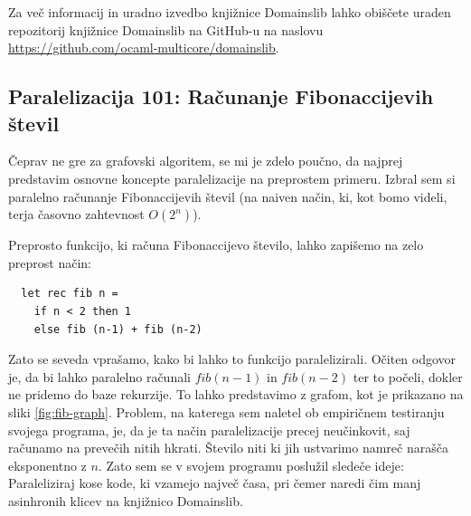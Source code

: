 \documentclass[mat1, tisk]{fmfdelo}
\begin{document}
Za več informacij in uradno izvedbo knjižnice Domainslib lahko obiščete uraden repozitorij knjižnice Domainslib na
GitHub-u na naslovu \url{https://github.com/ocaml-multicore/domainslib}.


\subsection{Paralelizacija 101: Računanje Fibonaccijevih števil}

Čeprav ne gre za grafovski algoritem, se mi je zdelo poučno, da najprej predstavim osnovne koncepte paralelizacije na preprostem primeru. 
Izbral sem si paralelno računanje Fibonaccijevih števil (na naiven način, ki, kot bomo videli, terja časovno zahtevnost $O(2^n)$).

Preprosto funkcijo, ki računa Fibonaccijevo število, lahko zapišemo na zelo preprost način:

\begin{lstlisting}
  let rec fib n =
    if n < 2 then 1
    else fib (n-1) + fib (n-2)
\end{lstlisting}

\begin{figure}[htb]
  \centering
{}
\end{figure}


Zato se seveda vprašamo, kako bi lahko to funkcijo paralelizirali. Očiten odgovor je, da bi lahko paralelno računali $fib(n-1)$ in $fib(n-2)$ ter to počeli,
dokler ne pridemo do baze rekurzije. To lahko predstavimo z grafom, kot je prikazano na sliki \ref{fig:fib-graph}.
Problem, na katerega sem naletel ob empiričnem testiranju svojega programa, je, da je ta način paralelizacije precej neučinkovit, 
saj računamo na prevečih nitih hkrati. Število niti ki jih ustvarimo namreč narašča eksponentno z $n$.
Zato sem se v svojem programu poslužil sledeče ideje: Paraleliziraj kose kode, ki vzamejo največ časa, 
pri čemer naredi čim manj asinhronih klicev na knjižnico Domainslib.
\end{document}
